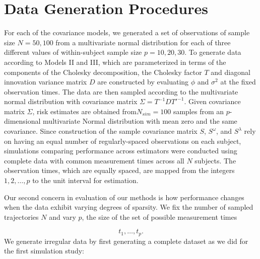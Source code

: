 \section{Data Generation Procedures}

For each of the covariance models, we generated a set of observations of sample size $N = 50, 100$ from a multivariate normal distribution for each of three different values of within-subject sample size $p = 10, 20, 30$. To generate data according to Models II and III, which are parameterized in terms of the components of the Cholesky decomposition, the Cholesky factor $T$ and diagonal innovation variance matrix $D$ are constructed by evaluating $\phi$ and $\sigma^2$ at the fixed observation times. The data are then sampled according to the multivariate normal distribution with covariance matrix $\Sigma = T^{-1} D {T'}^{-1}$. Given covariance matrix $\Sigma$, risk estimates are obtained from$N_{sim} = 100$ samples from an $p$-dimensional multivariate Normal distribution with mean zero and the same covariance.  Since construction of the sample covariance matrix $S$, $S^\omega$, and $S^\lambda$ rely on having an equal number of regularly-spaced observations on each subject, simulations comparing performance across estimators were conducted using complete data with common measurement times across all $N$ subjects. The observation times, which are equally spaced, are mapped from the integers $1,2, \dots, p$ to the unit interval for estimation.

\bigskip

Our second concern in evaluation of our methods is how performance changes when the data exhibit varying degrees of sparsity. We fix the number of sampled trajectories $N$ and vary $p$, the size of the set  of possible measurement times

\[
t_1,\dots, t_p.
\]
\noindent
We generate irregular data by first generating a complete dataset as we did for the first simulation study:


